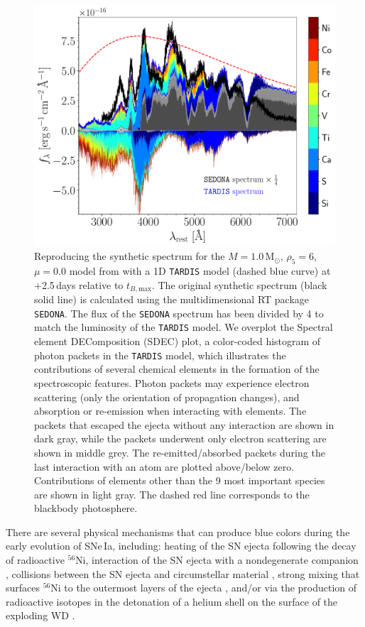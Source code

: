 \documentclass[twocolumn]{aastex631}
\begin{document}
\begin{CJK*}{UTF8}{gbsn}
\begin{figure}
    \centering
    \includegraphics[width=\linewidth]{TARDIS.pdf}
    \caption{Reproducing the synthetic spectrum for the $M=1.0\,\mathrm{M_\odot}$, $\rho_5=6$, $\mu=0.0$ model from \citet{Shen_2D_2021} with a 1D \texttt{TARDIS} model (dashed blue curve) at $+$2.5\,days relative to $t_{B,\mathrm{max}}$. The original synthetic spectrum (black solid line) is calculated using the multidimensional RT package \texttt{SEDONA}. The flux of the \texttt{SEDONA} spectrum has been divided by 4 to match the luminosity of the \texttt{TARDIS} model. We overplot the Spectral element DEComposition (SDEC) plot, a color-coded histogram of photon packets in the \texttt{TARDIS} model, which illustrates the contributions of several chemical elements in the formation of the spectroscopic features. Photon packets may experience electron scattering (only the orientation of propagation changes), and absorption or re-emission when interacting with elements. The packets that escaped the ejecta without any interaction are shown in dark gray, while the packets underwent only electron scattering are shown in middle grey. The re-emitted/absorbed packets during the last interaction with an atom are plotted above/below zero. Contributions of elements other than the 9 most important species are shown in light gray. The dashed red line corresponds to the blackbody photosphere.}
    \label{fig:tardis}
\end{figure}


There are several physical mechanisms that can produce blue colors during the early evolution of SNe\,Ia, including: heating of the SN ejecta following the decay of radioactive $^{56}$Ni, interaction of the SN ejecta with a nondegenerate companion \citep[e.g.,][]{Kasen_2010}, collisions between the SN ejecta and circumstellar material \citep[e.g.,][]{Piro_2016}, strong mixing that surfaces $^{56}$Ni to the outermost layers of the ejecta \citep[e.g.,][]{Piro_2013,Magee_2020}, and/or via the production of radioactive isotopes in the detonation of a helium shell on the surface of the exploding WD \citep[e.g.,][]{Noebauer_2017,polin_observational_2019}.


\end{CJK*}
\end{document}
